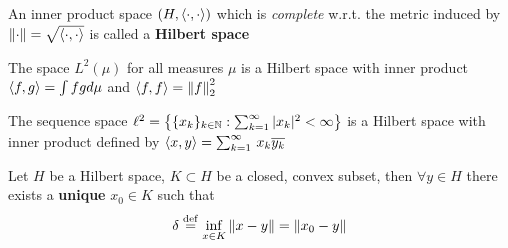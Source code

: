 \documentclass{article}
\begin{document}
\begin{definition}
	An inner product space $(H, \left<{\cdot},{\cdot}\right>)$ which is \textit{complete} w.r.t. the metric induced by $\left\|{\cdot}\right\|=\sqrt{\left<{\cdot},{\cdot}\right>}$ is called a \textbf{Hilbert space}
\end{definition}

\begin{example}[$L^2-$spaces]
	The space $L^2(\mu)$ for all measures $\mu$ is a Hilbert space with inner product $\left<{f},{g}\right>=\int fg d\mu$ and $\left<{f},{f}\right>=\left\|{f}\right\|_2^2$
\end{example}

\begin{example}[$l^2-$spaces]
	The sequence space
	$\ell^2=
		\left\{\{x_k\}_{k\in \mathbb{N}}:\sum_{k=1}^\infty |x_k|^2<\infty \right\}$
	is a Hilbert space with inner product defined by
	$
		\left<{x},{y}\right>=\sum_{k=1}^\infty \,{x_k \overline{y_k}}
	$
\end{example}

\begin{theorem}
	\nextline
	\label{nearest point}
	Let $H$ be a Hilbert space, $K\subset H$ be a closed, convex subset, then $\forall y \in H$ there exists a {\bf{unique}} $x_0\in K$ such that
	$$
		\delta \overset{\rm{def}}{=} \inf_{x\in K} \left\|{x-y}\right\| = \left\|{x_0-y}\right\|
	$$
\end{theorem}
\end{document}
